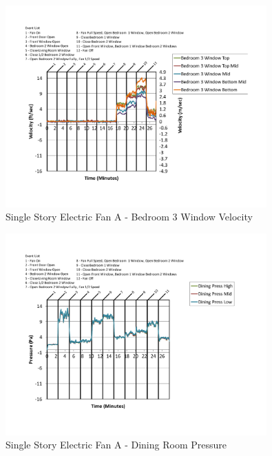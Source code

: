 \documentclass{article}
\begin{document}
\begin{appendices}
	\begin{figure}[H]
		\centering
		\includegraphics[height=3.05in,trim=0.67in 1.1in 0.67in 0.8in,clip=true]{0_Images/Results_Charts/ColdFlow/Single_Story/Electric/A/Bedroom_3_Window_Velocity.pdf}
		\caption{Single Story Electric Fan A - Bedroom 3 Window Velocity}
	\end{figure}
 

	\begin{figure}[H]
		\centering
		\includegraphics[height=3.05in,trim=0.67in 1.1in 0.67in 0.8in,clip=true]{0_Images/Results_Charts/ColdFlow/Single_Story/Electric/A/Dining_Room_Pressure.pdf}
		\caption{Single Story Electric Fan A - Dining Room Pressure}
	\end{figure}
 
	\clearpage


\end{appendices}
\end{document}
